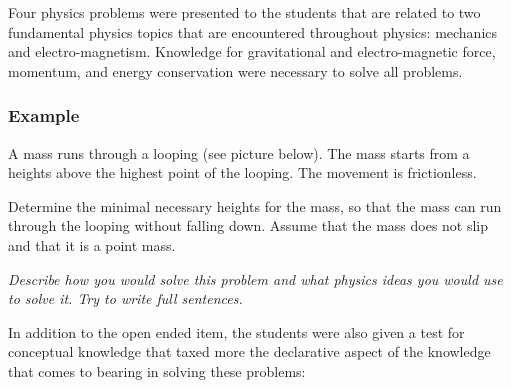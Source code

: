 \documentclass[D:/studies/WinnerS/Erhebungen/IPhO1718/paper/problem_solving/main/TaylorFrancis/interactapasample]{subfiles}
\begin{document}
Four physics problems were presented to the students that are related to two fundamental physics topics that are encountered throughout physics: mechanics and electro-magnetism. Knowledge for gravitational and electro-magnetic force, momentum, and energy conservation were necessary to solve all problems. 

\subsubsection*{Example}

\begin{tcolorbox}
A mass runs through a looping (see picture below). The mass starts from a heights above the highest point of the looping. The movement is frictionless.

Determine the minimal necessary heights for the mass, so that the mass can run through the looping without falling down. Assume that the mass does not slip and that it is a point mass.

\textit{Describe how you would solve this problem and what physics ideas you would use to solve it. Try to write full sentences.}

\begin{center}

\end{center}
\end{tcolorbox}

In addition to the open ended item, the students were also given a test for conceptual knowledge that taxed more the declarative aspect of the knowledge that comes to bearing in solving these problems:
\end{document}
